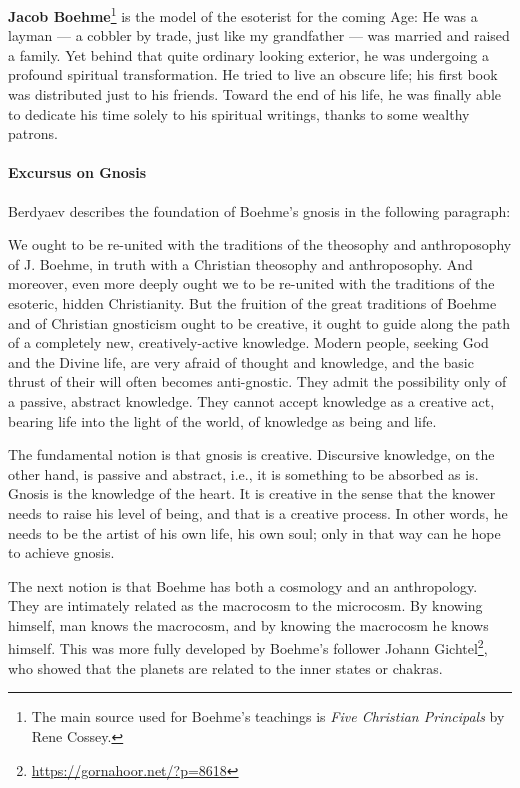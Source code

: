 \textbf{Jacob Boehme}\footnote{The main source used for Boehme's teachings is \textit{Five Christian Principals} by Rene Cossey.} is the model of the esoterist for the coming Age: He was a layman — a cobbler by trade, just like my grandfather — was married and raised a family. Yet behind that quite ordinary looking exterior, he was undergoing a profound spiritual transformation. He tried to live an obscure life; his first book was distributed just to his friends. Toward the end of his life, he was finally able to dedicate his time solely to his spiritual writings, thanks to some wealthy patrons.

\paragraph{Excursus on Gnosis}
Berdyaev describes the foundation of Boehme's gnosis in the following paragraph:

\begin{quotex}
We ought to be re-united with the traditions of the theosophy and anthroposophy of J. Boehme, in truth with a Christian theosophy and anthroposophy. And moreover, even more deeply ought we to be re-united with the traditions of the esoteric, hidden Christianity. But the fruition of the great traditions of Boehme and of Christian gnosticism ought to be creative, it ought to guide along the path of a completely new, creatively-active knowledge. Modern people, seeking God and the Divine life, are very afraid of thought and knowledge, and the basic thrust of their will often becomes anti-gnostic. They admit the possibility only of a passive, abstract knowledge. They cannot accept knowledge as a creative act, bearing life into the light of the world, of knowledge as being and life.  

\end{quotex}
The fundamental notion is that gnosis is creative. Discursive knowledge, on the other hand, is passive and abstract, i.e., it is something to be absorbed as is. Gnosis is the knowledge of the heart. It is creative in the sense that the knower needs to raise his level of being, and that is a creative process. In other words, he needs to be the artist of his own life, his own soul; only in that way can he hope to achieve gnosis.

The next notion is that Boehme has both a cosmology and an anthropology. They are intimately related as the macrocosm to the microcosm. By knowing himself, man knows the macrocosm, and by knowing the macrocosm he knows himself. This was more fully developed by Boehme's follower Johann Gichtel\footnote{\url{https://gornahoor.net/?p=8618}}, who showed that the planets are related to the inner states or chakras.

